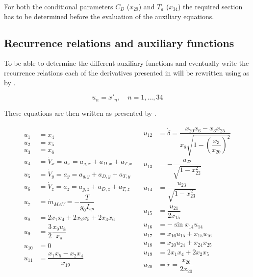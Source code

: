 For both the conditional parameters $C_{D}$ ($x_{29}$) and $T_{a}$ ($x_{34}$) the required section has to be determined before the evaluation of the auxiliary equations. 

\subsection{Recurrence relations and auxiliary functions}
\label{subsec:recRelAuxFunc}
To be able to determine the different auxiliary functions and eventually write the recurrence relations each of the derivatives presented in  will be rewritten using  as by \cite{scott2008high}. 

\begin{equation} \label{eq:un}
u_{n}=x'_{n}, \quad n=1,\dotsc,34
\end{equation}

These equations are then written as presented by .

\begin{align} \label{eq:unAuxEq1}
\begin{split} 
u_{1}&=x_{4}\\
u_{2}&=x_{5}\\
u_{3}&=x_{6} \\
u_{4}&=\dot{V}_{x}=a_{x}=a_{g,x}+a_{D,x}+a_{T,x}\\
u_{5}&=\dot{V}_{y}=a_{y}=a_{g,y}+a_{D,y}+a_{T,y}\\
u_{6}&=\dot{V}_{z}=a_{z}=a_{g,z}+a_{D,z}+a_{T,z}\\
u_{7} &=\dot{m}_{MAV}=-\dfrac{T}{g_{0}I_{sp}}\\
u_{8}&=2x_{1}x_{4}+2x_{2}x_{5}+2x_{3}x_{6}\\
u_{9}&=\dfrac{3}{2}\dfrac{x_{9}u_{8}}{x_{8}}\\
u_{10} &= 0 \\
u_{11} &= \dfrac{x_{1}x_{5}-x_{2}x_{4}}{x_{19}}\\
\end{split}
&
\begin{split}
u_{12} &= \dot{\delta} = \dfrac{x_{20}x_{6}-x_{3}x_{25}}{x_{8} \sqrt{1-\left(\dfrac{x_{3}}{x_{20}}\right)^{2}}}\\
u_{13} &= -\dfrac{u_{22}}{\sqrt{1-x_{22}^{2}}}\\
u_{14} &= \dfrac{u_{23}}{\sqrt{1-x_{23}^{2}}}\\
u_{15} &= \dfrac{u_{21}}{2 x_{15}}\\
u_{16} &= -\sin x_{14}u_{14}\\
u_{17} &= x_{16}u_{15}+x_{15}u_{16}\\
u_{18} &= x_{20}u_{24}+x_{24}x_{25}\\
u_{19} &= 2x_{1}x_{4}+2x_{2}x_{5}\\
u_{20} &= \dot{r} = \dfrac{x_{26}}{2 x_{20}}\\
\end{split}
\end{align}


